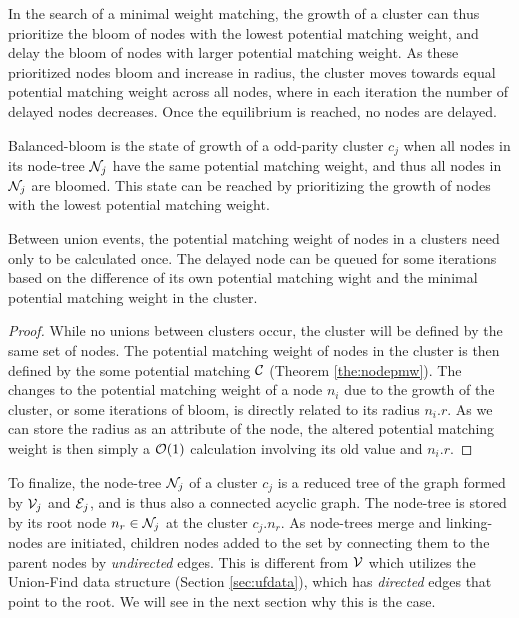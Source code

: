 In the search of a minimal weight matching, the growth of a cluster can thus prioritize the bloom of nodes with the lowest potential matching weight, and delay the bloom of nodes with larger potential matching weight. As these prioritized nodes bloom and increase in radius, the cluster moves towards equal potential matching weight across all nodes, where in each iteration the number of delayed nodes decreases. Once the equilibrium is reached, no nodes are delayed.
\begin{definition}\label{def:balancedbloom}
  Balanced-bloom is the state of growth of a odd-parity cluster $c_j$ when all nodes in its node-tree $\mathcal{N}_j$ have the same potential matching weight, and thus all nodes in $\mathcal{N}_j$ are bloomed. This state can be reached by prioritizing the growth of nodes with the lowest potential matching weight. 
\end{definition}
\begin{lemma}\label{lem:calconce}
  Between union events, the potential matching weight of nodes in a clusters need only to be calculated once. The delayed node can be queued for some iterations based on the difference of its own potential matching wight and the minimal potential matching weight in the cluster.
\end{lemma}
\begin{proof}
  While no unions between clusters occur, the cluster will be defined by the same set of nodes. The potential matching weight of nodes in the cluster is then defined by the some potential matching $\mathcal{C}$ (Theorem \ref{the:nodepmw}). The changes to the potential matching weight of a node $n_i$ due to the growth of the cluster, or some iterations of bloom, is directly related to its radius $n_i.r$. As we can store the radius as an attribute of the node, the altered potential matching weight is then simply a $\mathcal{O}(1)$ calculation involving its old value and $n_i.r$. 
\end{proof}

To finalize, the node-tree $\mathcal{N}_j$ of a cluster $c_j$ is a reduced tree of the graph formed by $\mathcal{V}_j$ and $\mathcal{E}_j$, and is thus also a connected acyclic graph. The node-tree is stored by its root node $n_r \in \mathcal{N}_j$ at the cluster $c_j.n_r$. As node-trees merge and linking-nodes are initiated, children nodes added to the set by connecting them to the parent nodes by \emph{undirected} edges. This is different from $\mathcal{V}$ which utilizes the Union-Find data structure (Section \ref{sec:ufdata}), which has \emph{directed} edges that point to the root. We will see in the next section why this is the case. 



